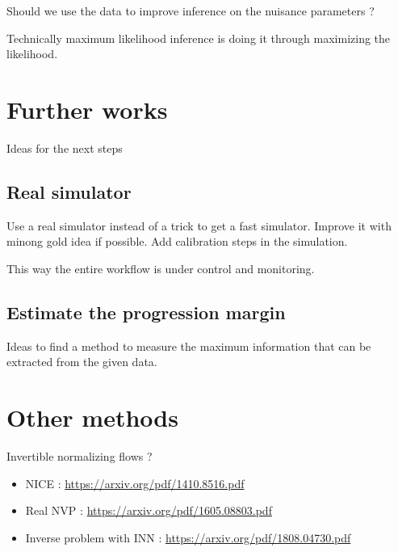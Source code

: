 Should we use the data to improve inference on the nuisance parameters ?

Technically maximum likelihood inference is doing it through maximizing the likelihood.


\section{Further works} %
\label{sec:further_works}

Ideas for the next steps

\subsection{Real simulator} %
\label{sub:real_simulator}

Use a real simulator instead of a trick to get a fast simulator.
Improve it with minong gold idea if possible.
Add calibration steps in the simulation.

This way the entire workflow is under control and monitoring.



\subsection{Estimate the progression margin} %
\label{sub:estimate_the_progression_margin}

Ideas to find a method to measure the maximum information that can be extracted from the given data.





\section{Other methods} %
\label{sec:other_methods}

Invertible normalizing flows ?
\begin{itemize}
	\item NICE : \url{https://arxiv.org/pdf/1410.8516.pdf}
	\item Real NVP : \url{https://arxiv.org/pdf/1605.08803.pdf}
	\item Inverse problem with INN : \url{https://arxiv.org/pdf/1808.04730.pdf}
\end{itemize}







